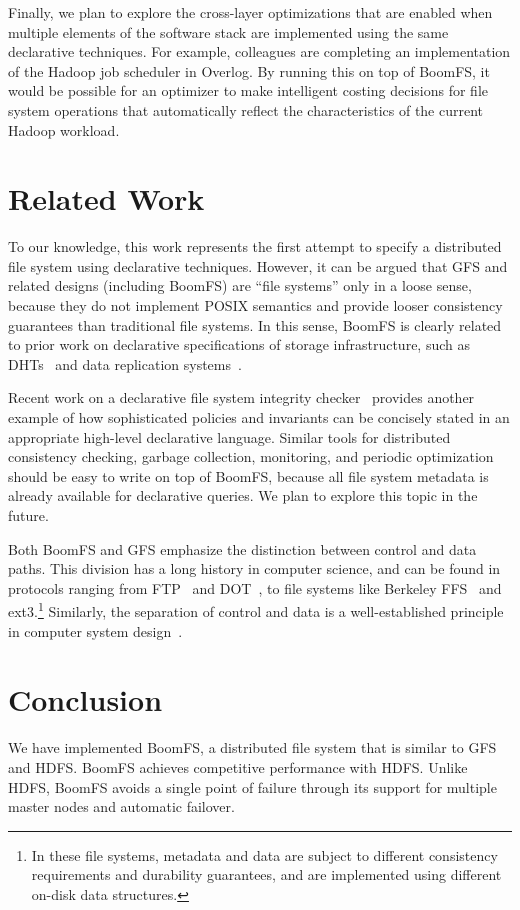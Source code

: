 \documentclass[twocolumn]{article}
\begin{document}
Finally, we plan to explore the cross-layer optimizations that are
enabled when multiple elements of the software stack are implemented
using the same declarative techniques. For example, colleagues are
completing an implementation of the Hadoop job scheduler in
Overlog. By running this on top of BoomFS, it would be possible for an
optimizer to make intelligent costing decisions for file system
operations that automatically reflect the characteristics of the
current Hadoop workload.

\section{Related Work}
\label{related-work}
To our knowledge, this work represents the first attempt to specify a
distributed file system using declarative techniques. However, it can
be argued that GFS and related designs (including BoomFS) are
``file systems'' only in a loose sense, because they do not implement
POSIX semantics and provide looser consistency guarantees than
traditional file systems. In this sense, BoomFS is clearly related to
prior work on declarative specifications of storage infrastructure,
such as DHTs~\cite{chord-overlog} and data replication
systems~\cite{padre-draft}.

Recent work on a declarative file system integrity checker~\cite{sqck}
provides another example of how sophisticated policies and invariants
can be concisely stated in an appropriate high-level declarative
language. Similar tools for distributed consistency checking, garbage
collection, monitoring, and periodic optimization should be easy to
write on top of BoomFS, because all file system metadata is already
available for declarative queries. We plan to explore this topic in
the future.

Both BoomFS and GFS emphasize the distinction between control and data
paths. This division has a long history in computer science, and can
be found in protocols ranging from FTP~\cite{ftp-rfc} and
DOT~\cite{dot}, to file systems like Berkeley FFS~\cite{ffs} and
ext3.\footnote{In these file systems, metadata and data are subject to
  different consistency requirements and durability guarantees, and
  are implemented using different on-disk data structures.} Similarly,
the separation of control and data is a well-established principle in
computer system design~\cite{hydra-policy-mech-sep}.

\section{Conclusion}
\label{conclusion}
We have implemented BoomFS, a distributed file system that is similar
to GFS and HDFS. BoomFS achieves competitive performance with
HDFS. Unlike HDFS, BoomFS avoids a single point of failure through its
support for multiple master nodes and automatic failover.
\end{document}
